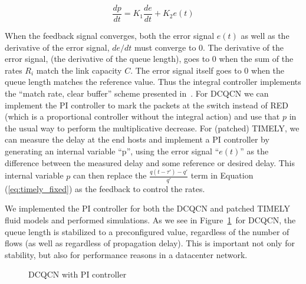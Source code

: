 $$ \frac{dp}{dt} = K_1\frac{de}{dt}+K_2e(t) $$

When the feedback signal converges, both the error signal $e(t)$ as
well as the derivative of the error signal, $de/dt$ must converge to
0. The derivative of the error signal, (the derivative of the queue length), goes to 0
when the sum of the rates $R_i$ match the link capacity $C$. The error signal itself goes to 0
when the queue length matches the reference value. Thus the integral
controller implements the ``match rate, clear buffer'' scheme
presented in~\cite{REM}. For DCQCN we can implement the PI
controller to mark the packets at the switch instead of RED (which is
a proportional controller without the integral action) and use that
$p$ in the usual way to perform the multiplicative decrease. For
(patched) TIMELY, we can
measure the delay at the end hosts and implement a PI controller by
generating an internal variable ``p'', using the error signal
``$e(t)$'' as the difference between the measured delay and some
reference or desired delay. This internal variable $p$ can then
replace the $\tfrac{{q(t - \tau ') - q'}}{{q'}}$ term in
Equation (\ref{eq:timely_fixed}) as the feedback to control the rates.

We implemented the PI controller for both the DCQCN and patched TIMELY
fluid models and performed simulations. As we see in
Figure~\ref{fig:dcqcn_pi}~for DCQCN, the queue length is stabilized to a
preconfigured value, regardless of the number of flows (as well as
regardless of propagation delay). This is important not only for
stability, but also for performance reasons in a datacenter network.

\begin{figure}
\caption{DCQCN with PI controller}
\label{fig:dcqcn_pi}
\end{figure}

